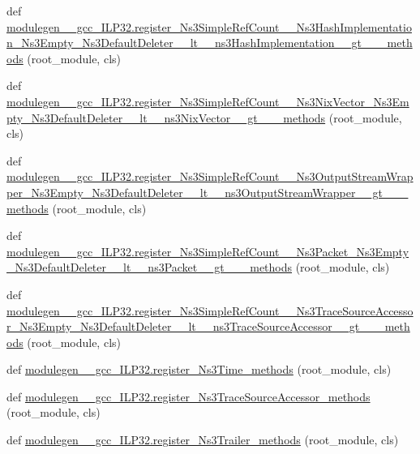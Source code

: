 \begin{DoxyCompactItemize}
\item 
def \hyperlink{namespacemodulegen____gcc__ILP32_a59dad6cf46a3eb90ab74f8388a4708b9}{modulegen\+\_\+\+\_\+gcc\+\_\+\+I\+L\+P32.\+register\+\_\+\+Ns3\+Simple\+Ref\+Count\+\_\+\+\_\+\+Ns3\+Hash\+Implementation\+\_\+\+Ns3\+Empty\+\_\+\+Ns3\+Default\+Deleter\+\_\+\+\_\+lt\+\_\+\+\_\+ns3\+Hash\+Implementation\+\_\+\+\_\+gt\+\_\+\+\_\+\+\_\+methods} (root\+\_\+module, cls)
\item 
def \hyperlink{namespacemodulegen____gcc__ILP32_acf2fe3353b3614ad36d5edc27d55dc08}{modulegen\+\_\+\+\_\+gcc\+\_\+\+I\+L\+P32.\+register\+\_\+\+Ns3\+Simple\+Ref\+Count\+\_\+\+\_\+\+Ns3\+Nix\+Vector\+\_\+\+Ns3\+Empty\+\_\+\+Ns3\+Default\+Deleter\+\_\+\+\_\+lt\+\_\+\+\_\+ns3\+Nix\+Vector\+\_\+\+\_\+gt\+\_\+\+\_\+\+\_\+methods} (root\+\_\+module, cls)
\item 
def \hyperlink{namespacemodulegen____gcc__ILP32_a4d1d8838713af407eb5e2cdb71da8b0b}{modulegen\+\_\+\+\_\+gcc\+\_\+\+I\+L\+P32.\+register\+\_\+\+Ns3\+Simple\+Ref\+Count\+\_\+\+\_\+\+Ns3\+Output\+Stream\+Wrapper\+\_\+\+Ns3\+Empty\+\_\+\+Ns3\+Default\+Deleter\+\_\+\+\_\+lt\+\_\+\+\_\+ns3\+Output\+Stream\+Wrapper\+\_\+\+\_\+gt\+\_\+\+\_\+\+\_\+methods} (root\+\_\+module, cls)
\item 
def \hyperlink{namespacemodulegen____gcc__ILP32_a0ef742c28dd795a6ce9adfeac1b275b8}{modulegen\+\_\+\+\_\+gcc\+\_\+\+I\+L\+P32.\+register\+\_\+\+Ns3\+Simple\+Ref\+Count\+\_\+\+\_\+\+Ns3\+Packet\+\_\+\+Ns3\+Empty\+\_\+\+Ns3\+Default\+Deleter\+\_\+\+\_\+lt\+\_\+\+\_\+ns3\+Packet\+\_\+\+\_\+gt\+\_\+\+\_\+\+\_\+methods} (root\+\_\+module, cls)
\item 
def \hyperlink{namespacemodulegen____gcc__ILP32_a54ea4c3c62de90cf295c66cffbc336c8}{modulegen\+\_\+\+\_\+gcc\+\_\+\+I\+L\+P32.\+register\+\_\+\+Ns3\+Simple\+Ref\+Count\+\_\+\+\_\+\+Ns3\+Trace\+Source\+Accessor\+\_\+\+Ns3\+Empty\+\_\+\+Ns3\+Default\+Deleter\+\_\+\+\_\+lt\+\_\+\+\_\+ns3\+Trace\+Source\+Accessor\+\_\+\+\_\+gt\+\_\+\+\_\+\+\_\+methods} (root\+\_\+module, cls)
\item 
def \hyperlink{namespacemodulegen____gcc__ILP32_a4bcbbf479533e8b6fb238739668fe36d}{modulegen\+\_\+\+\_\+gcc\+\_\+\+I\+L\+P32.\+register\+\_\+\+Ns3\+Time\+\_\+methods} (root\+\_\+module, cls)
\item 
def \hyperlink{namespacemodulegen____gcc__ILP32_a3451d08858386f1fa04131d165c83ba0}{modulegen\+\_\+\+\_\+gcc\+\_\+\+I\+L\+P32.\+register\+\_\+\+Ns3\+Trace\+Source\+Accessor\+\_\+methods} (root\+\_\+module, cls)
\item 
def \hyperlink{namespacemodulegen____gcc__ILP32_a7be1ac5e0e1a8ec544474f384e1642fc}{modulegen\+\_\+\+\_\+gcc\+\_\+\+I\+L\+P32.\+register\+\_\+\+Ns3\+Trailer\+\_\+methods} (root\+\_\+module, cls)

\end{DoxyCompactItemize}
